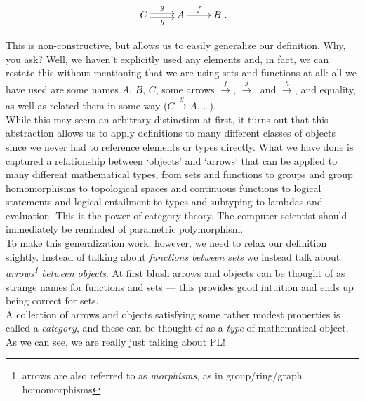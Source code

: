 \[\xymatrix{  C \ar@<.5ex>[r]^g\ar@<-.5ex>[r]_h & A \ar[r]^f & B}.\]

This is non-constructive, but allows us to easily generalize our definition.
Why, you ask?  Well, we haven't explicitly used any elements and, in fact, we
can restate this without mentioning that we are using sets and functions at all:
all we have used are some names \(A\), \(B\), \(C\), some arrows
\(\xrightarrow{f}\), \(\xrightarrow{g}\), and \(\xrightarrow{h}\), and
equality, as well as related them in some way (\(C\xrightarrow{g} A\), \ldots). \\

While this may seem an arbitrary distinction at first, it turns out that this
abstraction allows us to apply definitions to many different classes of objects
since we never had to reference elements or types directly.  What we have done
is captured a relationship between `objects' and `arrows' that can be applied to
many different mathematical types, from sets and functions to groups and
group homomorphisms to topological spaces and continuous functions to
logical statements and logical entailment to types and subtyping to lambdas and
evaluation. This is the power of category theory.  The computer scientist should
immediately be reminded of parametric polymorphism.\\

To make this generalization work, however, we need to relax our definition
slightly. Instead of talking about \textit{functions between sets} we instead
talk about \textit{arrows\footnote{arrows are also referred to as
\textit{morphisms}, as in group/ring/graph homomorphisms} between objects}. At
first blush arrows and objects can be thought of as strange names for functions
and sets --- this provides good intuition and ends up being correct for sets.\\

A collection of arrows and objects satisfying some rather modest properties is
called a \textit{category}, and these can be thought of as a \textit{type} of
mathematical object. As we can see, we are really just talking about PL!\\

